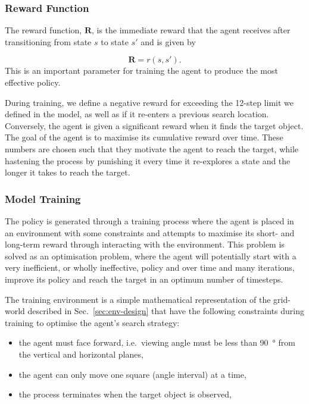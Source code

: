 \documentclass[a4paper, twoside]{article}
\begin{document}
\subsubsection{Reward Function}

\noindent The reward function, $\mathbf{R}$, is the immediate reward that the agent receives after transitioning from state $s$ to state $s'$ and is given by 

\begin{equation}
  \mathbf{R} = r(s, s').
\end{equation} 
This is an important parameter for training the agent to produce the most effective policy. 

During training, we define a negative reward for exceeding the 12-step limit we defined in the model, as well as if it re-enters a previous search location. Conversely, the agent is given a significant reward when it finds the target object. The goal of the agent is to maximise its cumulative reward over time. These numbers are chosen such that they motivate the agent to reach the target, while hastening the process by punishing it every time it re-explores a state and the longer it takes to reach the target. 

\subsubsection{Model Training}

\noindent The policy is generated through a training process where the agent is placed in an environment with some constraints and attempts to maximise its short- and long-term reward through interacting with the environment. This problem is solved as an optimisation problem, where the agent will potentially start with a very inefficient, or wholly ineffective, policy and over time and many iterations, improve its policy and reach the target in an optimum number of timesteps. 

The training environment is a simple mathematical representation of the grid-world described in Sec.~\ref{sec:env-design} that have the following constraints during training to optimise the agent's search strategy:

\begin{itemize}
  \item the agent must face forward, i.e.\ viewing angle must be less than \SI{90}{\degree} from the vertical and horizontal planes,
  \item the agent can only move one square (angle interval) at a time, 
  \item the process terminates when the target object is observed,
\end{itemize}
\end{document}
